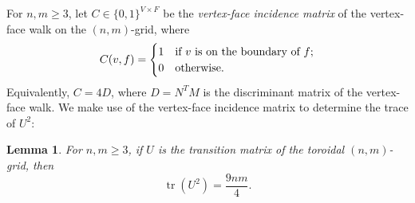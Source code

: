 \documentclass{article}
\newtheorem{lemma}[theorem]{Lemma}
\numberwithin{equation}{section}
\DeclareMathOperator\tr{tr}
\begin{document}
For $n,m \geq 3$, let $C \in \{0,1\}^{V \times F}$ be the \textsl{vertex-face incidence matrix} of the vertex-face walk on the $(n,m)$-grid, where
\begin{equation}
\label{eq:C_definition}
C(v,f) = \begin{cases}
$1$ &\text{if $v$ is on the boundary of $f$;} \\
$0$ &\text{otherwise.}
\end{cases}
\end{equation}
Equivalently, $C = 4D$, where $D = N^TM$ is the discriminant matrix of the vertex-face walk.  We make use of the vertex-face incidence matrix to determine the trace of $U^2$:
\begin{lemma}
\label{lem:trace_U^2}
For $n,m \geq 3$, if $U$ is the transition matrix of the toroidal $(n,m)$-grid, then
\[
\tr(U^2) = \frac{9nm}{4}.
\]
\end{lemma}
\end{document}

